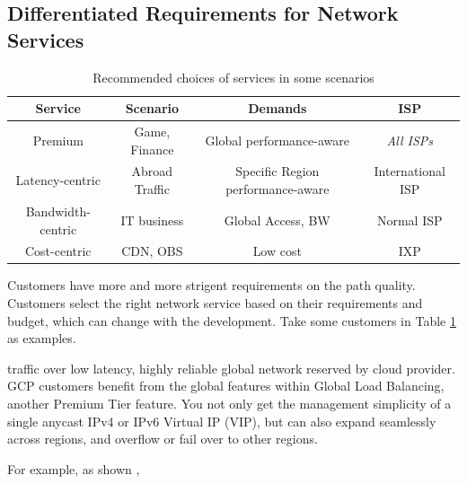 
\subsection{Differentiated Requirements for Network Services} 



\begin{table}[tbp]
	\footnotesize
	\centering
	\begin{tabular}{c|c|c|c}
		\hline
		\bf{Service} & \bf{Scenario} & \bf{Demands} & \bf{ISP} \\
		\hline \hline
		Premium  & Game, Finance & Global performance-aware & \emph{All ISPs} \\
		\hline
		Latency-centric & Abroad Traffic & Specific Region performance-aware & International ISP \\
		\hline
	    Bandwidth-centric & IT business & Global Access, BW & Normal ISP \\
		\hline
	  Cost-centric & CDN, OBS & Low cost & IXP \\
		\hline
	\end{tabular}
        \vspace{-0.1in}
	\caption{\small Recommended choices of services in some scenarios}
	\label{table:classification}
\end{table}

Customers have more and more strigent requirements on the path quality. Customers select the right network service based on their requirements and budget, which can change with the development. Take some customers in Table \ref{table:classification} as examples. 

traffic over low latency, highly reliable global network reserved by cloud provider. GCP customers benefit from the global features within Global Load Balancing, another Premium Tier feature. You not only get the management simplicity of a single anycast IPv4 or IPv6 Virtual IP (VIP), but can also expand seamlessly across regions, and overflow or fail over to other regions.

For example, as shown , 




